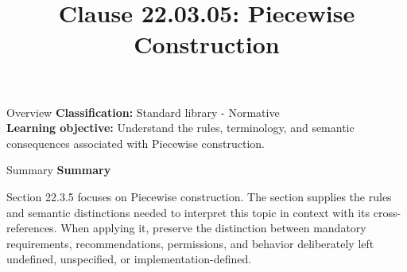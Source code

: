\documentclass[10pt,letterpaper]{article}
\title{Clause 22.03.05: Piecewise Construction}
\author{}
\date{}
\begin{document}
\maketitle
\begin{CornellOverviewBox}{Overview}
\textbf{Classification:} Standard library - Normative\\[2pt]
\textbf{Learning objective:} Understand the rules, terminology, and semantic consequences associated with Piecewise construction.
\end{CornellOverviewBox}\begin{CornellSummaryBox}{Summary}
{\sffamily\bfseries\color{Accent} Summary}\par\vspace{3pt}Section 22.3.5 focuses on Piecewise construction. The section supplies the rules and semantic distinctions needed to interpret this topic in context with its cross-references. When applying it, preserve the distinction between mandatory requirements, recommendations, permissions, and behavior deliberately left undefined, unspecified, or implementation-defined.
\end{CornellSummaryBox}
\end{document}
